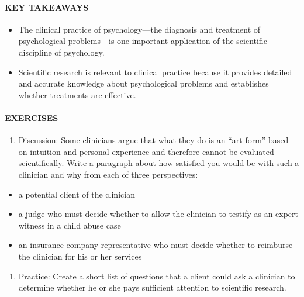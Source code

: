 \documentclass[
]{krantz}
\providecommand{\tightlist}{%
  \setlength{\itemsep}{0pt}\setlength{\parskip}{0pt}}
\begin{document}
\hypertarget{key-takeaways-3}{%
\paragraph*{KEY TAKEAWAYS}\label{key-takeaways-3}}

\begin{itemize}
\tightlist
\item
  The clinical practice of psychology---the diagnosis and treatment of psychological problems---is one important application of the scientific discipline of psychology.
\item
  Scientific research is relevant to clinical practice because it provides detailed and accurate knowledge about psychological problems and establishes whether treatments are effective.
\end{itemize}

\hypertarget{exercises-3}{%
\paragraph*{EXERCISES}\label{exercises-3}}

\begin{enumerate}
\def\labelenumi{\arabic{enumi}.}
\tightlist
\item
  Discussion: Some clinicians argue that what they do is an ``art form'' based on intuition and personal experience and therefore cannot be evaluated scientifically. Write a paragraph about how satisfied you would be with such a clinician and why from each of three perspectives:
\end{enumerate}

\begin{itemize}
\tightlist
\item
  a potential client of the clinician
\item
  a judge who must decide whether to allow the clinician to testify as an expert witness in a child abuse case
\item
  an insurance company representative who must decide whether to reimburse the clinician for his or her services
\end{itemize}

\begin{enumerate}
\def\labelenumi{\arabic{enumi}.}
\setcounter{enumi}{1}
\tightlist
\item
  Practice: Create a short list of questions that a client could ask a clinician to determine whether he or she pays sufficient attention to scientific research.
\end{enumerate}
\end{document}
